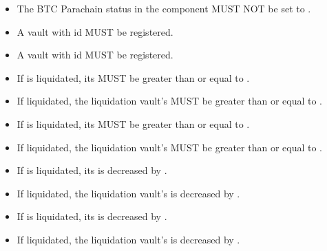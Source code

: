\documentclass[a4paper,10pt,english]{sphinxmanual}
\begin{document}
\begin{itemize}
\item {} 
The BTC Parachain status in the {\hyperref[\detokenize{spec/security:security}]{}} component MUST NOT be set to .

\item {} 
A vault with id  MUST be registered.

\item {} 
A vault with id  MUST be registered.

\item {} 
If  is  liquidated, its  MUST be greater than or equal to .

\item {} 
If   liquidated, the liquidation vault’s  MUST be greater than or equal to .

\item {} 
If  is  liquidated, its  MUST be greater than or equal to .

\item {} 
If   liquidated, the liquidation vault’s  MUST be greater than or equal to .

\end{itemize}

\begin{itemize}
\item {} 
If  is  liquidated, its  is decreased by .

\item {} 
If   liquidated, the liquidation vault’s  is decreased by .

\item {} 
If  is  liquidated, its  is decreased by .

\item {} 
If   liquidated, the liquidation vault’s   is decreased by .

\end{itemize}
\end{document}
